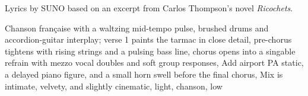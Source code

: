 
\begin{notes}
Lyrics by SUNO based on an excerpt from Carlos Thompson's novel \emph{Ricochets}.
\end{notes}
\begin{style}
Chanson française with a waltzing mid-tempo pulse, brushed drums and accordion-guitar interplay; verse 1 paints the tarmac in close detail, pre-chorus tightens with rising strings and a pulsing bass line, chorus opens into a singable refrain with mezzo vocal doubles and soft group responses, Add airport PA static, a delayed piano figure, and a small horn swell before the final chorus, Mix is intimate, velvety, and slightly cinematic, light, chanson, low
\end{style}
